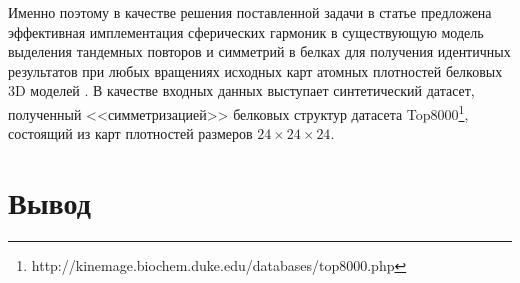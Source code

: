 \documentclass[12pt,twosides]{article}
\begin{document}
	 Именно поэтому в качестве решения поставленной задачи в статье предложена эффективная имплементация сферических гармоник в существующую модель выделения тандемных повторов и симметрий в белках для получения идентичных результатов при любых вращениях исходных карт атомных плотностей белковых 3D моделей \cite{DeepSymmetry18}. В качестве входных данных выступает синтетический датасет, полученный <<симметризацией>> белковых структур датасета Top8000\footnote{ http://kinemage.biochem.duke.edu/databases/top8000.php}, состоящий из карт плотностей размеров $24\times24\times24$. 
	 
	\section{Вывод}

	
	
	
\end{document}
